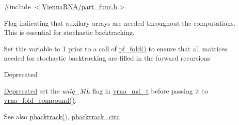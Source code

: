 {\ttfamily \#include $<$\hyperlink{part__func_8h}{Vienna\+R\+N\+A/part\+\_\+func.\+h}$>$}



Flag indicating that auxilary arrays are needed throughout the computations. This is essential for stochastic backtracking. 

Set this variable to 1 prior to a call of \hyperlink{group__pf__fold_gadc3db3d98742427e7001a7fd36ef28c2}{pf\+\_\+fold()} to ensure that all matrices needed for stochastic backtracking are filled in the forward recursions

\begin{DoxyRefDesc}{Deprecated}
\item[\hyperlink{deprecated__deprecated000093}{Deprecated}]set the {\itshape uniq\+\_\+\+M\+L} flag in \hyperlink{group__model__details_ga1f8a10e12a0a1915f2a4eff0b28ea17c}{vrna\+\_\+md\+\_\+t} before passing it to \hyperlink{group__fold__compound_ga6601d994ba32b11511b36f68b08403be}{vrna\+\_\+fold\+\_\+compound()}.\end{DoxyRefDesc}


\begin{DoxySeeAlso}{See also}
\hyperlink{group__subopt__stochbt_gac03ca6db186bb3bf0a2a326d7fb3ba03}{pbacktrack()}, \hyperlink{group__subopt__stochbt_ga00474051204ac9ad576b3e45174d03ff}{pbacktrack\+\_\+circ} 
\end{DoxySeeAlso}
